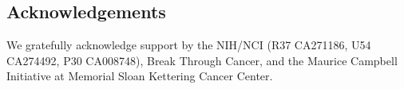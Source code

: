 \subsection*{Acknowledgements}

We gratefully acknowledge support by the NIH/NCI (R37 CA271186, U54 CA274492, P30 CA008748), Break Through Cancer, and the Maurice Campbell Initiative at Memorial Sloan Kettering Cancer Center.